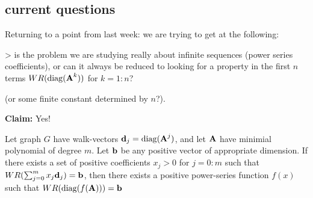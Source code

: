 \subsection{current questions}

Returning to a point from last week: we are trying to get at the following:

> is the problem we are studying really about infinite sequences (power series coefficients), or can it always be reduced to looking for a property in the first $n$ terms $WR(\operatorname{diag}(\textbf{A}^k))$ for $k = 1:n$?

(or some finite constant determined by $n$?).

\textbf{Claim:} Yes!

\begin{lemma}\label{thm:finitewalks}
  Let graph $G$ have walk-vectors $\textbf{d}_j = \operatorname{diag}(\textbf{A}^j)$, and let $\textbf{A}$ have minimial polynomial of degree $m$. Let $\textbf{b}$ be any positive vector of appropriate dimension.
  If there exists a set of positive coefficients $x_j > 0 $ for $j = 0:m$ such that $WR(\sum_{j=0}^{m}  x_j \textbf{d}_j )=  \textbf{b}$, then there exists a positive power-series function $f(x)$ such that $WR(\operatorname{diag}( f(\textbf{A}))) = \textbf{b}$
\end{lemma}
